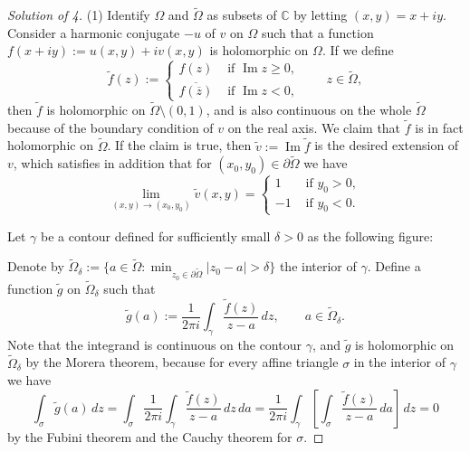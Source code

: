 \documentclass[a4paper]{article}
\theoremstyle{definition}
\renewcommand{\Im}{\operatorname{Im}}
\newcommand{\C}{\mathbb{C}}
\newcommand{\e}{\varepsilon}
\renewcommand{\tilde}{\widetilde}
\renewcommand{\bar}{\overline}
\begin{document}
\newpage
\begin{proof}[Solution of 4]
(1)
Identify $\Omega$ and $\tilde\Omega$ as subsets of $\C$ by letting $(x,y)=x+iy$.
Consider a harmonic conjugate $-u$ of $v$ on $\Omega$ such that a function $f(x+iy):=u(x,y)+iv(x,y)$ is holomorphic on $\Omega$.
If we define
\[\tilde f(z):=\begin{cases}
f(z)&\text{ if }\Im z\ge0,\\
\bar{f(\bar z)}&\text{ if }\Im z<0,
\end{cases}\qquad z\in\tilde\Omega,\]
then $\tilde f$ is holomorphic on $\tilde\Omega\setminus(0,1)$, and is also continuous on the whole $\tilde\Omega$ because of the boundary condition of $v$ on the real axis.
We claim that $\tilde f$ is in fact holomorphic on $\tilde\Omega$.
If the claim is true, then $\tilde v:=\Im\tilde f$ is the desired extension of $v$, which satisfies in addition that for $(x_0,y_0)\in\partial\tilde\Omega$ we have
\[\lim_{(x,y)\to(x_0,y_0)}\tilde v(x,y)=\begin{cases}
1&\text{ if }y_0>0,\\
-1&\text{ if }y_0<0.
\end{cases}\]



Let $\gamma$ be a contour defined for sufficiently small $\delta>0$ as the following figure:
\begin{center}
\end{center}
Denote by $\tilde\Omega_\delta:=\{a\in\tilde\Omega:\min_{z_0\in\partial\tilde\Omega}|z_0-a|>\delta\}$ the interior of $\gamma$.
Define a function $\tilde g$ on $\tilde\Omega_\delta$ such that
\[\tilde g(a):=\frac1{2\pi i}\int_{\gamma}\frac{\tilde f(z)}{z-a}\,dz,\qquad a\in\tilde\Omega_\delta.\]
Note that the integrand is continuous on the contour $\gamma$, and $\tilde g$ is holomorphic on $\tilde\Omega_\delta$ by the Morera theorem, because for every affine triangle $\sigma$ in the interior of $\gamma$ we have
\[\int_{\sigma}\tilde g(a)\,dz=\int_{\sigma}\frac1{2\pi i}\int_{\gamma}\frac{\tilde f(z)}{z-a}\,dz\,da=\frac1{2\pi i}\int_{\gamma}\left[\int_{\sigma}\frac{\tilde f(z)}{z-a}\,da\right]\,dz=0\]
by the Fubini theorem and the Cauchy theorem for $\sigma$.


\end{proof}
\end{document}
